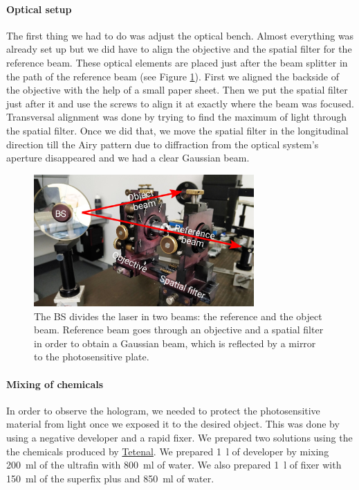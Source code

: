 \documentclass[11pt,a4paper]{article}
\begin{document}
\paragraph{Optical setup}
The first thing we had to do was adjust the optical bench. Almost everything was already set up but we did have to align the objective and the spatial filter for the reference beam. These optical elements are placed just after the beam splitter in the path of the reference beam (see Figure \ref{fig:optical_bench_1}). First we aligned the backside of the objective with the help of a small paper sheet. Then we put the spatial filter just after it and use the screws to align it at exactly where the beam was focused. Transversal alignment was done by trying to find the maximum of light through the spatial filter. Once we did that, we move the spatial filter in the longitudinal direction till the Airy pattern due to diffraction from the optical system's aperture disappeared and we had a clear Gaussian beam.

\begin{figure}[ht]
\centering
\includegraphics[width=0.75\textwidth]{Optical_bench_1}
\caption{The BS divides the laser in two beams: the reference and the object beam. Reference beam goes through an objective and a spatial filter in order to obtain a Gaussian beam, which is reflected by a mirror to the photosensitive plate.}
\label{fig:optical_bench_1}
\end{figure}

\paragraph{Mixing of chemicals}
In order to observe the hologram, we needed to protect the photosensitive material from light once we exposed it to the desired object. This was done by using a negative developer and a rapid fixer. We prepared two solutions using the the chemicals produced by \href{https://www.tetenal.com/}{Tetenal}. We prepared \SI{1}{\litre} of developer by mixing \SI{200}{\milli\litre} of the ultrafin with \SI{800}{\milli\litre} of water. We also prepared \SI{1}{\litre} of fixer with \SI{150}{\milli\litre} of the superfix plus and \SI{850}{\milli\litre} of water.
\end{document}

